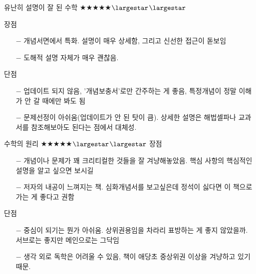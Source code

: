 유난히 설명이 잘 된 수학  $\bigstar$$\bigstar$$\bigstar$$\bigstar$$\bigstar$$\largestar$$\largestar$
\vspace{5mm}

장점

\begin{itemize}
    \item[$-$] 개념서면에서 특화. 설명이 매우 상세함, 그리고 신선한 접근이 돋보임
    \item[$-$] 도해적 설명 자체가 매우 괜찮음.
\end{itemize}
\vspace{5mm}

단점

\begin{itemize}
    \item[$-$] 업데이트 되지 않음, '개념보충서'로만 간주하는 게 좋음, 특정개념이 정말 이해가 안 갈 때에만 봐도 됨
    \item[$-$] 문제선정이 아쉬움(업데이트가 안 된 탓이 큼). 상세한 설명은 해법셀파나 교과서를 참조해보아도 된다는 점에서 대체성.
\end{itemize}
\vspace{5mm}

수학의 원리  $\bigstar$$\bigstar$$\bigstar$$\bigstar$$\bigstar$$\largestar$$\largestar$
장점  
\begin{itemize}

	\item[$-$] 개념이나 문제가 꽤 크리티컬한 것들을 잘 겨냥해놓았음. 핵심 사항의 핵심적인 설명을 알고 싶으면 보시길  
	\item[$-$] 저자의 내공이 느껴지는 책. 심화개념서를 보고싶은데 정석이 싫다면 이 책으로 가는 게 좋다고 권함  
\end{itemize}
단점 
\begin{itemize}
    \item[$-$] 중심이 되기는 뭔가 아쉬움. 상위권용임을 차라리 표방하는 게 좋지 않았을까. 서브로는 좋지만 메인으로는 그닥임  
    \item[$-$] 생각 외로 독학은 어려울 수 있음, 책이 애당초 중상위권 이상을 겨냥하고 있기 때문.
\end{itemize}


